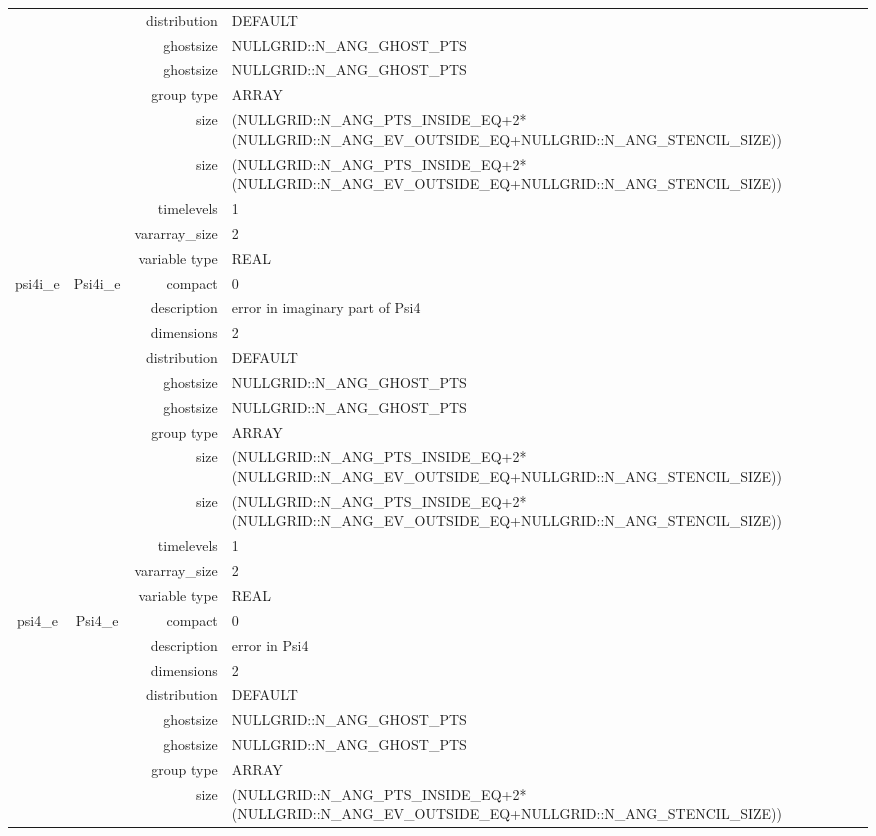 \begin{tabular*}{150mm}{|c|c@{\extracolsep{\fill}}|rl|}
 &  & distribution & DEFAULT \\ 
 &  & ghostsize & NULLGRID::N\_ANG\_GHOST\_PTS \\ 
& ~ & ghostsize & NULLGRID::N\_ANG\_GHOST\_PTS \\ 
 &  & group type & ARRAY \\ 
 &  & size & (NULLGRID::N\_ANG\_PTS\_INSIDE\_EQ+2*(NULLGRID::N\_ANG\_EV\_OUTSIDE\_EQ+NULLGRID::N\_ANG\_STENCIL\_SIZE)) \\ 
& ~ & size & (NULLGRID::N\_ANG\_PTS\_INSIDE\_EQ+2*(NULLGRID::N\_ANG\_EV\_OUTSIDE\_EQ+NULLGRID::N\_ANG\_STENCIL\_SIZE)) \\ 
 &  & timelevels & 1 \\ 
 &  & vararray\_size & 2 \\ 
 &  & variable type & REAL \\ 
\hline 
psi4i\_e & Psi4i\_e & compact & 0 \\ 
 &  & description & error in imaginary part of Psi4 \\ 
 &  & dimensions & 2 \\ 
 &  & distribution & DEFAULT \\ 
 &  & ghostsize & NULLGRID::N\_ANG\_GHOST\_PTS \\ 
& ~ & ghostsize & NULLGRID::N\_ANG\_GHOST\_PTS \\ 
 &  & group type & ARRAY \\ 
 &  & size & (NULLGRID::N\_ANG\_PTS\_INSIDE\_EQ+2*(NULLGRID::N\_ANG\_EV\_OUTSIDE\_EQ+NULLGRID::N\_ANG\_STENCIL\_SIZE)) \\ 
& ~ & size & (NULLGRID::N\_ANG\_PTS\_INSIDE\_EQ+2*(NULLGRID::N\_ANG\_EV\_OUTSIDE\_EQ+NULLGRID::N\_ANG\_STENCIL\_SIZE)) \\ 
 &  & timelevels & 1 \\ 
 &  & vararray\_size & 2 \\ 
 &  & variable type & REAL \\ 
\hline 
psi4\_e & Psi4\_e & compact & 0 \\ 
 &  & description & error in Psi4 \\ 
 &  & dimensions & 2 \\ 
 &  & distribution & DEFAULT \\ 
 &  & ghostsize & NULLGRID::N\_ANG\_GHOST\_PTS \\ 
& ~ & ghostsize & NULLGRID::N\_ANG\_GHOST\_PTS \\ 
 &  & group type & ARRAY \\ 
 &  & size & (NULLGRID::N\_ANG\_PTS\_INSIDE\_EQ+2*(NULLGRID::N\_ANG\_EV\_OUTSIDE\_EQ+NULLGRID::N\_ANG\_STENCIL\_SIZE)) \\ 

\end{tabular*}
